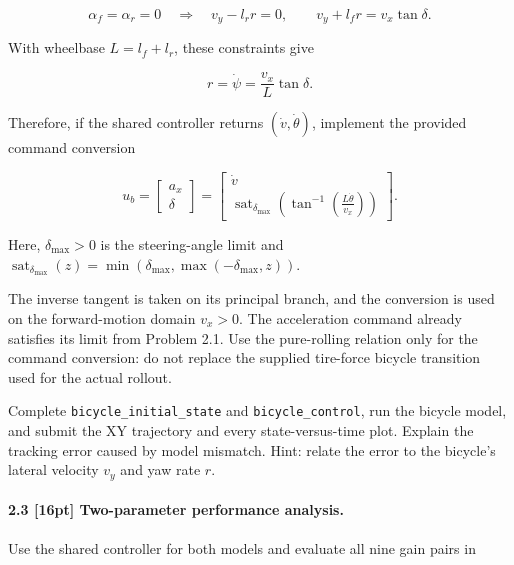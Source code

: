 \begin{equation}
\alpha_f=\alpha_r=0
\quad\Longrightarrow\quad
v_y-l_r r=0,
\qquad
v_y+l_f r=v_x\tan\delta.
\end{equation}

With wheelbase $L=l_f+l_r$, these constraints give

\begin{equation}
r=\dot\psi=\frac{v_x}{L}\tan\delta.
\end{equation}

Therefore, if the shared controller returns $(\dot v,\dot\theta)$, implement
the provided command conversion

\begin{equation}\label{eq:control-conversion}
u_b=
\begin{bmatrix}a_x\\\delta\end{bmatrix}
=
\begin{bmatrix}
\dot v\\
\operatorname{sat}_{\delta_{\max}}
\!\left(\tan^{-1}\!\left(\frac{L\dot\theta}{v_x}\right)\right)
\end{bmatrix}.
\end{equation}

Here, $\delta_{\max}>0$ is the steering-angle limit and
$\operatorname{sat}_{\delta_{\max}}(z)=
\min(\delta_{\max},\max(-\delta_{\max},z))$.

The inverse tangent is taken on its principal branch, and the conversion is
used on the forward-motion domain $v_x>0$. The acceleration command already
satisfies its limit from Problem 2.1. Use the pure-rolling relation only for
the command conversion: do not replace the supplied tire-force bicycle
transition used for the actual rollout.

Complete \texttt{bicycle\_initial\_state} and \texttt{bicycle\_control}, run
the bicycle model, and submit the XY trajectory and every state-versus-time
plot. Explain the tracking error caused by model mismatch. Hint: relate the
error to the bicycle's lateral velocity $v_y$ and yaw rate $r$.

\solution{}

\paragraph{2.3 [16pt] Two-parameter performance analysis.}
Use the shared controller for both models and evaluate all nine gain pairs in

